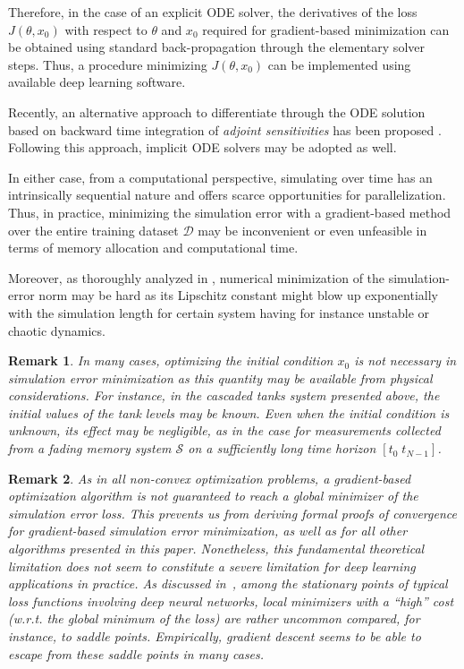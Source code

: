 \documentclass{article} %
\newtheorem{remark}{Remark}{\normalfont}{\normalfont}
\newcommand{\So}{{\mathcal{S}}}            %
\newcommand{\Did}{{\mathcal{D}}}
\begin{document}
Therefore, in the case  of an explicit ODE solver, the derivatives of the loss $J(\theta, x_0)$ with respect to $\theta$ and $x_0$ 
required for gradient-based minimization can be obtained using standard back-propagation through the elementary solver steps. 
Thus, a procedure minimizing $J(\theta, x_0)$ can be implemented using available deep learning software. 

Recently, an alternative approach to differentiate through the ODE solution based on backward time integration of \emph{adjoint sensitivities} has been proposed \cite{chen2018neural}. Following this approach, implicit ODE solvers may be  adopted as well. 

In either case, from a computational perspective,  simulating over time has an intrinsically sequential nature and offers scarce opportunities for parallelization. Thus, in practice,  minimizing the simulation error with a gradient-based method over the entire training dataset  $\Did$ may be inconvenient or even unfeasible in terms of memory allocation and computational time. 

{Moreover, as thoroughly analyzed in \cite{ribeiro2020smoothness}, numerical minimization of the 
simulation-error norm may be hard as its Lipschitz constant might blow up exponentially with the simulation length for certain system having for instance unstable or chaotic dynamics.}

\begin{remark}
In many cases, optimizing the initial condition $x_0$ is not necessary in simulation error minimization as this quantity may be available from physical considerations. For instance, in the cascaded tanks system presented above, the initial values of the tank levels may be known.  Even when the initial condition is unknown, its effect may be negligible, as in the case for measurements collected from a \emph{fading memory} system $\So$ on a sufficiently long time horizon $[t_0 \; t_{N-1}]$.
\end{remark}

{
\begin{remark}
As in all non-convex optimization problems, a gradient-based optimization algorithm is not guaranteed to reach a global minimizer of the simulation error loss. This prevents us from deriving formal proofs of convergence for gradient-based simulation error minimization, as well as for all other algorithms presented in this paper. Nonetheless, this fundamental theoretical limitation does not seem to constitute a severe limitation for deep learning applications in practice. As discussed in~\cite[Ch.~8.2]{goodfellow2016deep}, among the stationary points of typical loss functions involving deep neural networks, local minimizers with a ``high'' cost (w.r.t. the global minimum of the loss) are rather uncommon compared, for instance, to saddle points. Empirically, gradient descent seems to be able to escape from these saddle points in many cases.
\end{remark}
}
\end{document}
